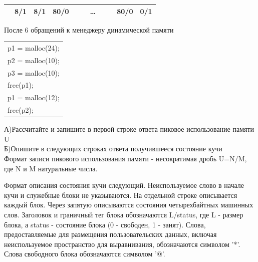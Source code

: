 \documentclass[12pt, letterpaper]{article}
\begin{document}
\begin{center}
    \begin{tabular}{|c|c|c|c|c|c|c|c|c|c|c|}
        \hline
         \cellcolor{black} & \cellcolor[gray]{0.9} 8/1 & \cellcolor[gray]{0.9} 8/1 & 80/0 & & & \dots & & & 80/0 & 0/1 \\
        \hline
    \end{tabular}
\end{center}

После 6 обращений к менеджеру динамической памяти

\begin{center}
    \begin{tabular}{l}
        p1 = malloc(24);\\
        p2 = malloc(10);\\
        p3 = malloc(10);\\
        free(p1);\\
        p1 = malloc(12);\\
        free(p2);\\
    \end{tabular}
\end{center}

\noindent А)Рассчитайте и запишите в первой строке ответа пиковое использование памяти U\\
Б)Опишите в следующих строках ответа получившееся состояние кучи\\

Формат записи пикового использования памяти - несократимая дробь U=N/M, где N и M натуральные числа.

Формат описания состояния кучи следующий. Неиспользуемое слово в начале кучи и служебные блоки не указываются. На отдельной строке описывается каждый блок. Через запятую описываются состояния четырехбайтных машинных слов. Заголовок и граничный тег блока обозначаются L/status, где L - размер блока, а status - состояние блока (0 - свободен, 1 - занят). Слова, предоставляемые для размещения пользовательских данных, включая неиспользуемое пространство для выравнивания, обозначаются символом '*'. Слова свободного блока обозначаются символом '@'.
\newpage
\end{document}
